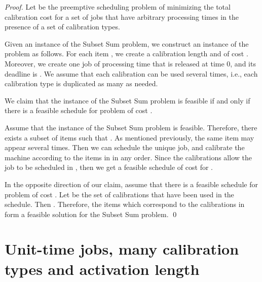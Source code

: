 \begin{proof}
Let  be the preemptive scheduling problem of minimizing the total calibration cost for a set of  jobs that have arbitrary processing times in the presence of a set of  calibration types.

Given an instance of the {\sc Subset Sum} problem, we construct an instance of the problem  as follows. For each item , we create a calibration length  and of cost . Moreover, we create one job of processing time  that is released at time 0, and its deadline is . We assume that each calibration can be used several times, i.e., each calibration type is duplicated as many as needed.

We claim that the instance of the {\sc Subset Sum} problem is feasible if and only if there is a feasible schedule for problem  of cost .

Assume that the instance of the {\sc Subset Sum} problem is feasible. Therefore, there exists a subset of items  such that . As mentioned previously, the same item may appear several times. Then we can schedule the unique job, and calibrate the machine according to the items in  in any order. Since the calibrations allow the job to be scheduled in , then we get a feasible schedule of cost  for .

In the opposite direction of our claim, assume that there is a feasible schedule for problem  of cost . Let  be the set of calibrations that have been used in the schedule. Then . Therefore, the items which correspond to the calibrations in  form a feasible solution for the {\sc Subset Sum} problem. 
\qed\end{proof}

\section{Unit-time jobs, many calibration types and activation length}
\label{sec:act_unit}


